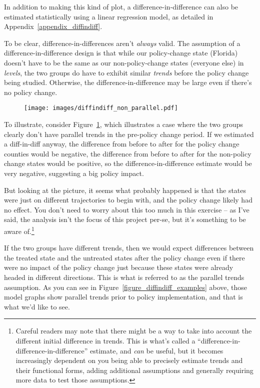 \documentclass[12pt]{article}
\begin{document}
In addition to making this kind of plot, a difference-in-difference can also be estimated statistically using a linear regression model, as detailed in Appendix~\ref{appendix_diffindiff}.

To be clear, difference-in-differences aren't \emph{always} valid. The assumption of a difference-in-difference design is that while our policy-change state (Florida) doesn't have to be the same as our non-policy-change states (everyone else) in \emph{levels}, the two groups do have to exhibit similar \emph{trends} before the policy change being studied. Otherwise, the difference-in-difference may be large even if there's no policy change.

\begin{figure}[h!]
  \centering
  \caption{}\label{figure_diffindiff_nonparallel}
  \texttt{[image: images/diffindiff\_non\_parallel.pdf]}
\end{figure}


To illustrate, consider Figure~\ref{figure_diffindiff_nonparallel}, which illustrates a case where the two groups clearly don't have parallel trends in the pre-policy change period. If we estimated a diff-in-diff anyway, the difference from before to after for the policy change counties would be negative, the difference from before to after for the non-policy change states would be positive, so the difference-in-difference estimate would be very negative, suggesting a big policy impact.

But looking at the picture, it seems what probably happened is that the states were just on different trajectories to begin with, and the policy change likely had no effect. You don't need to worry about this too much in this exercise -- as I've said, the analysis isn't the focus of this project per-se, but it's something to be aware of.\footnote{Careful readers may note that there might be a way to take into account the different initial difference in trends. This is what's called a ``difference-in-difference-in-difference'' estimate, and \emph{can} be useful, but it becomes increasingly dependent on you being able to precisely estimate trends and their functional forms, adding additional assumptions and generally requiring more data to test those assumptions.}



If the two groups have different trends, then we would expect differences between the treated state and the untreated states after the policy change even if there were no impact of the policy change just because these states were already headed in different directions.  This is what is referred to as the parallel trends assumption. As you can see in Figure~\ref{figure_diffindiff_examples} above, those model graphs show parallel trends prior to policy implementation, and that is what we'd like to see.
\end{document}
